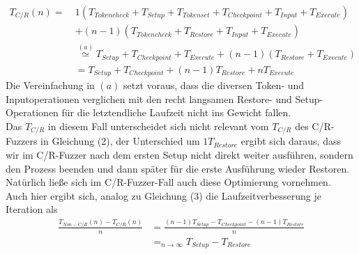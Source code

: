 \documentclass[a4paper]{article}
\begin{document}
\begin{equation}
    \begin{split}
        T_{C/R}(n) =\ &1 (T_{Tokencheck} + T_{Setup} + T_{Tokenset} + T_{Checkpoint} + T_{Input} + T_{Execute}) \\
            &+ (n - 1) (T_{Tokencheck} + T_{Restore} + T_{Input} + T_{Execute}) \\
            &\overset{(a)}{\simeq} T_{Setup} + T_{Checkpoint} + T_{Execute} + (n-1) (T_{Restore} + T_{Execute}) \\
            &= T_{Setup} + T_{Checkpoint} + (n-1) T_{Restore} + n T_{Execute}
    \end{split}
\end{equation}
Die Vereinfachung in $(a)$ setzt voraus, dass die diversen Token- und Inputoperationen verglichen mit den recht langsamen Restore- und Setup-Operationen für die letztendliche Laufzeit nicht ins Gewicht fallen.\\
Das $T_{C/R}$ in diesem Fall unterscheidet sich nicht relevant vom $T_{C/R}$ des C/R-Fuzzers in Gleichung (2), der Unterschied um $1 T_{Restore}$ ergibt sich daraus, dass wir im C/R-Fuzzer nach dem ersten Setup nicht direkt weiter ausführen, sondern den Prozess beenden und dann später für die erste Ausführung wieder Restoren. Natürlich ließe sich im C/R-Fuzzer-Fall auch diese Optimierung vornehmen.\\
Auch hier ergibt sich, analog zu Gleichung (3) die Laufzeitverbesserung je Iteration als
\begin{equation}
    \begin{split}
        \frac{T_{Non-C/R}(n) - T_{C/R}(n)}{n} &= \frac{(n-1) T_{Setup} - T_{Checkpoint} - (n-1) T_{Restore}}{n} \\
        &=_{n \to \infty} T_{Setup} - T_{Restore}
    \end{split}
\end{equation}
\end{document}
